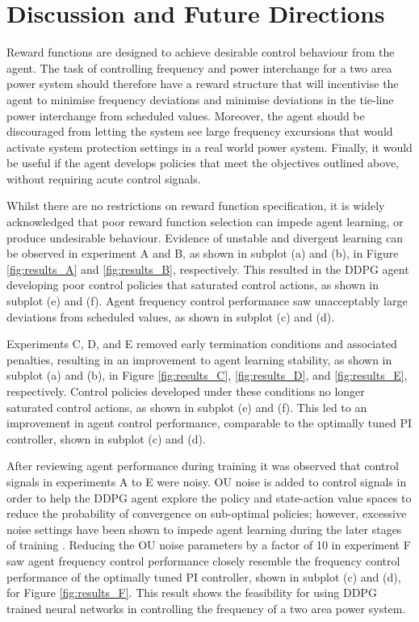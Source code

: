 \chapter{Discussion and Future Directions}

Reward functions are designed to achieve desirable control behaviour from the agent. The task of controlling frequency and power interchange for a two area power system should therefore have a reward structure that will incentivise the agent to minimise frequency deviations and minimise deviations in the tie-line power interchange from scheduled values. Moreover, the agent should be discouraged from letting the system see large frequency excursions that would activate system protection settings in a real world power system. Finally, it would be useful if the agent develops policies that meet the objectives outlined above, without requiring acute control signals.

Whilst there are no restrictions on reward function specification, it is widely acknowledged that poor reward function selection can impede agent learning, or produce undesirable behaviour. Evidence of unstable and divergent learning can be observed in experiment A and B, as shown in subplot (a) and (b), in Figure \ref{fig:results_A} and \ref{fig:results_B}, respectively. This resulted in the DDPG agent developing poor control policies that saturated control actions, as shown in subplot (e) and (f). Agent frequency control performance saw unacceptably large deviations from scheduled values, as shown in subplot (c) and (d).

Experiments C, D, and E removed early termination conditions and associated penalties, resulting in an improvement to agent learning stability, as shown in subplot (a) and (b), in Figure \ref{fig:results_C}, \ref{fig:results_D}, and \ref{fig:results_E}, respectively. Control policies developed under these conditions no longer saturated control actions, as shown in subplot (e) and (f). This led to an improvement in agent control performance, comparable to the optimally tuned PI controller, shown in subplot (c) and (d).

After reviewing agent performance during training it was observed that control signals in experiments A to E were noisy. OU noise is added to control signals in order to help the DDPG agent explore the policy and state-action value spaces to reduce the probability of convergence on sub-optimal policies; however, excessive noise settings have been shown to impede agent learning during the later stages of training \cite{}. Reducing the OU noise parameters by a factor of 10 in experiment F saw agent frequency control performance closely resemble the frequency control performance of the optimally tuned PI controller, shown in subplot (c) and (d), for Figure \ref{fig:results_F}. This result shows the feasibility for using DDPG trained neural networks in controlling the frequency of a two area power system.